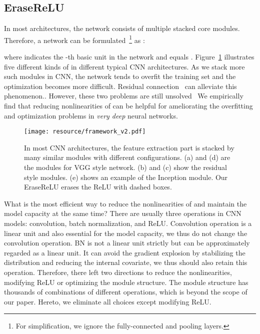 \documentclass[10pt,twocolumn,letterpaper]{article}
\begin{document}
\subsection{EraseReLU}


In most architectures, the network consists of multiple stacked core modules. Therefore, a network can be formulated~\footnote{For simplification, we ignore the fully-connected and pooling layers.} as :

\vspace{-3mm}
{\small

}
\vspace{-3mm}

\noindent where  indicates the -th basic unit in the network and  equals . 
Figure~\ref{fig:module} illustrates five different kinds of  in different typical CNN architectures.
As we stack more such modules in CNN, the network tends to overfit the training set and the optimization becomes more difficult.
Residual connection~\cite{he2016deep} can alleviate this phenomenon..
However, these two problems are still unsolved~\cite{zagoruyko2017diracnets}
We empirically find that reducing nonlinearities of  can be helpful for ameliorating the overfitting and optimization problems in \textit{very deep} neural networks.


\begin{figure}[t]
\center
\texttt{[image: resource/framework\_v2.pdf]}
\caption{In most CNN architectures, the feature extraction part is stacked by many similar modules with different configurations. (a) and (d) are the modules for VGG style network. (b) and (c) show the residual style modules. (e) shows an example of the Inception module. Our EraseReLU erases the ReLU with dashed boxes.
}
\label{fig:module}
\end{figure}


What is the most efficient way to reduce the nonlinearities of  and maintain the model capacity at the same time?
There are usually three operations in CNN models: convolution, batch normalization, and ReLU.
Convolution operation is a linear unit and also essential for the model capacity, we thus do not change the convolution operation.
BN is not a linear unit strictly but can be approximately regarded as a linear unit. It can avoid the gradient explosion by stabilizing the distribution and reducing the internal covariate, we thus should also retain this operation. Therefore, there left two directions to reduce the nonlinearities, modifying ReLU or optimizing the module structure. The module structure has thousands of combinations of different operations, which is beyond the scope of our paper. Hereto, we eliminate all choices except modifying ReLU.
\end{document}
